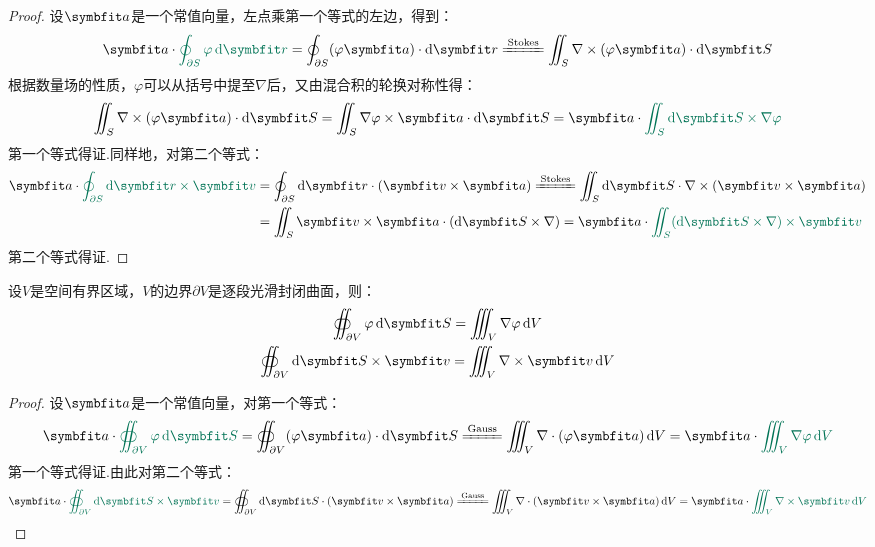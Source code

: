 \begin{proof}
    设$\vb{a}$是一个常值向量，左点乘第一个等式的左边，得到：
    \[\vb{a}\cdot\textcolor{GreenDeep}{\oint_{\partial S}\varphi\dd{\vb{r}}} = \oint_{\partial S}(\varphi\vb{a})\cdot\dd{\vb{r}} \xlongequal{\text{Stokes}} \iint_S \nabla\times(\varphi\vb{a})\cdot\dd{\vb{S}}\]
    根据数量场的性质，$\varphi$可以从括号中提至$\nabla$后，又由混合积的轮换对称性得：
    \[\iint_S \nabla\times(\varphi\vb{a})\cdot\dd{\vb{S}} = \iint_S \nabla\varphi \times \vb{a}\cdot\dd{\vb{S}} = \vb{a}\cdot\textcolor{GreenDeep}{\iint_S\dd{\vb{S}}\times\nabla\varphi}\]
    第一个等式得证.同样地，对第二个等式：
    \begin{align*}
        \vb{a}\cdot\textcolor{GreenDeep}{\oint_{\partial S}\dd{\vb{r}}\times\vb{v}} &= \oint_{\partial S}\dd{\vb{r}}\cdot(\vb{v}\times\vb{a}) \xlongequal{\text{Stokes}} \iint_S \dd{\vb{S}}\cdot\nabla\times(\vb{v}\times\vb{a})\\
        &= \iint_S \vb{v}\times\vb{a}\cdot(\dd{\vb{S}}\times\nabla) = \vb{a}\cdot\textcolor{GreenDeep}{\iint_S(\dd{\vb{S}}\times\nabla)\times\vb{v}}
    \end{align*}
    第二个等式得证.
\end{proof}

\begin{theorem}
    设$V$是空间有界区域，$V$的边界$\partial V$是逐段光滑封闭曲面，则：
    \begin{gather*}
        \oiint_{\partial V}\varphi\dd{\vb{S}} = \iiint_V \nabla\varphi\dd{V}\\
        \oiint_{\partial V}\dd{\vb{S}}\times\vb{v} = \iiint_V\nabla\times\vb{v}\dd{V}
    \end{gather*}
\end{theorem}

\begin{proof}
    设$\vb{a}$是一个常值向量，对第一个等式：
    \[\vb{a}\cdot\textcolor{GreenDeep}{\oiint_{\partial V}\varphi\dd{\vb{S}}} = \oiint_{\partial V}(\varphi\vb{a})\cdot\dd{\vb{S}} \xlongequal{\text{Gauss}} \iiint_V\nabla\cdot(\varphi\vb{a})\dd{V} = \vb{a}\cdot\textcolor{GreenDeep}{\iiint_V\nabla\varphi\dd{V}}\]
    第一个等式得证.由此对第二个等式：
    \[\vb{a}\cdot\textcolor{GreenDeep}{\oiint_{\partial V}\dd{\vb{S}}\times\vb{v}} = \oiint_{\partial V}\dd{\vb{S}}\cdot(\vb{v}\times\vb{a}) \xlongequal{\text{Gauss}} \iiint_V\nabla\cdot(\vb{v}\times\vb{a})\dd{V} = \vb{a}\cdot\textcolor{GreenDeep}{\iiint_V\nabla\times\vb{v}\dd{V}}\]
\end{proof}

